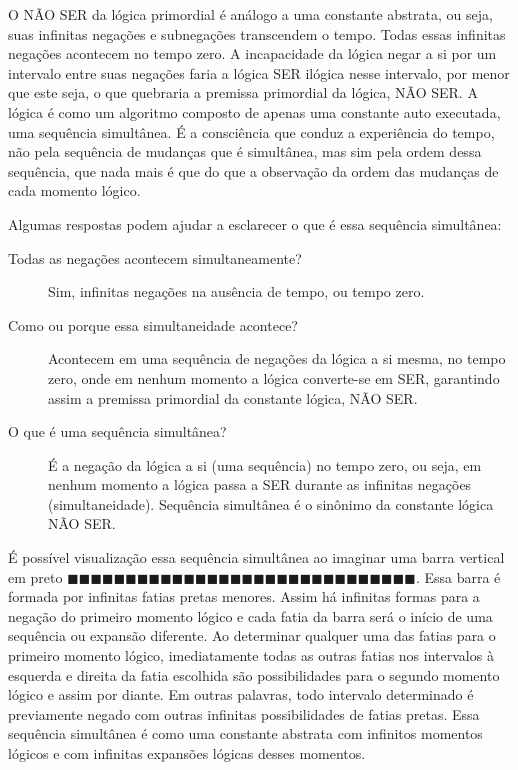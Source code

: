 O NÃO SER da lógica primordial é análogo a uma constante abstrata, ou seja, suas infinitas negações e subnegações transcendem o tempo. Todas essas infinitas negações acontecem no tempo zero. A incapacidade da lógica negar a si por um intervalo entre suas negações faria a lógica SER ilógica nesse intervalo, por menor que este seja, o que quebraria a premissa primordial da lógica, NÃO SER. A lógica é como um algoritmo composto de apenas uma constante auto executada, uma sequência simultânea. É a consciência que conduz a experiência do tempo, não pela sequência de mudanças que é simultânea, mas sim pela ordem dessa sequência, que nada mais é que do que a observação da ordem das mudanças de cada momento lógico.

Algumas respostas podem ajudar a esclarecer o que é essa sequência simultânea:
	\begin{description}
	   \item[Todas as negações acontecem simultaneamente?] Sim, infinitas negações na ausência de tempo, ou tempo zero.
	   \item[Como ou porque essa simultaneidade acontece?] Acontecem em uma sequência de negações da lógica a si mesma, no tempo zero, onde em nenhum momento a lógica converte-se em SER, garantindo assim a premissa primordial da constante lógica, NÃO SER.
	   \item[O que é uma sequência simultânea?] É a negação da lógica a si (uma sequência) no tempo zero, ou seja, em nenhum momento a lógica passa a SER durante as infinitas negações (simultaneidade). Sequência simultânea é o sinônimo da constante lógica NÃO SER.
	\end{description}

É possível visualização essa sequência simultânea ao imaginar uma barra vertical em preto $\!\blacksquare\!\blacksquare\!\blacksquare\!\blacksquare\!\blacksquare\!\blacksquare\!\blacksquare\!\blacksquare\!\blacksquare\!\blacksquare\!\blacksquare\!\blacksquare\!\blacksquare\!\blacksquare\!\blacksquare\!\blacksquare\!\blacksquare\!\blacksquare\!\blacksquare\!\blacksquare\!\blacksquare\!\blacksquare\!\blacksquare\!\blacksquare\!\blacksquare\!\blacksquare\!\blacksquare\!\blacksquare\!\blacksquare\!\blacksquare$. Essa barra é formada por infinitas fatias pretas menores. Assim há infinitas formas para a negação do primeiro momento lógico e cada fatia da barra será o início de uma sequência ou expansão diferente. Ao determinar qualquer uma das fatias para o primeiro momento lógico, imediatamente todas as outras fatias nos intervalos à esquerda e direita da fatia escolhida são possibilidades para o segundo momento lógico e assim por diante. Em outras palavras, todo intervalo determinado é previamente negado com outras infinitas possibilidades de fatias pretas. Essa sequência simultânea é como uma constante abstrata com infinitos momentos lógicos e com infinitas expansões lógicas desses momentos.